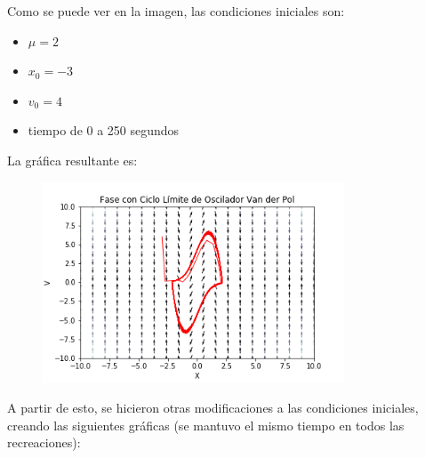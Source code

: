 \documentclass[a4paper]{article}
\begin{document}
Como se puede ver en la imagen, las condiciones iniciales son:
\begin{itemize}
\item $\mu = 2$
\item $x_0 = -3$
\item $v_0 = 4$
\item tiempo de 0 a 250 segundos
\end{itemize}

La gráfica resultante es:

\begin{figure}[ht!]
 \centering
  \includegraphics[width=0.8\textwidth]{VP_Ex1.png}
\end{figure}

A partir de esto, se hicieron otras modificaciones a las condiciones iniciales, creando las siguientes gráficas (se mantuvo el mismo tiempo en todos las recreaciones):

\pagebreak
\end{document}
